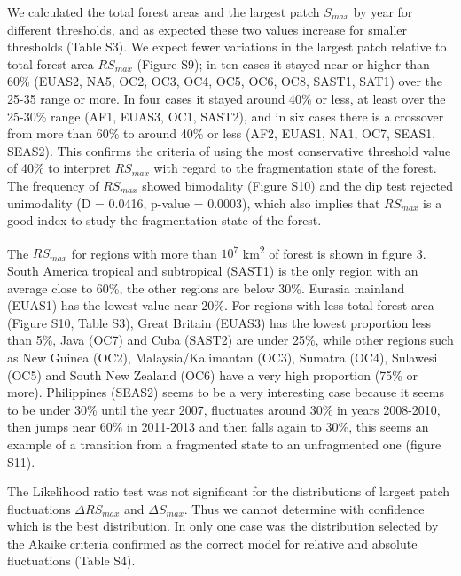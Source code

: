 \documentclass[]{article}
\begin{document}
We calculated the total forest areas and the largest patch \(S_{max}\)
by year for different thresholds, and as expected these two values
increase for smaller thresholds (Table S3). We expect fewer variations
in the largest patch relative to total forest area \(RS_{max}\) (Figure
S9); in ten cases it stayed near or higher than 60\% (EUAS2, NA5, OC2,
OC3, OC4, OC5, OC6, OC8, SAST1, SAT1) over the 25-35 range or more. In
four cases it stayed around 40\% or less, at least over the 25-30\%
range (AF1, EUAS3, OC1, SAST2), and in six cases there is a crossover
from more than 60\% to around 40\% or less (AF2, EUAS1, NA1, OC7, SEAS1,
SEAS2). This confirms the criteria of using the most conservative
threshold value of 40\% to interpret \(RS_{max}\) with regard to the
fragmentation state of the forest. The frequency of \(RS_{max}\) showed
bimodality (Figure S10) and the dip test rejected unimodality (D =
0.0416, p-value = 0.0003), which also implies that \(RS_{max}\) is a
good index to study the fragmentation state of the forest.

The \(RS_{max}\) for regions with more than \(10^{7}\) \si{km^2} of
forest is shown in figure 3. South America tropical and subtropical
(SAST1) is the only region with an average close to 60\%, the other
regions are below 30\%. Eurasia mainland (EUAS1) has the lowest value
near 20\%. For regions with less total forest area (Figure S10, Table
S3), Great Britain (EUAS3) has the lowest proportion less than 5\%, Java
(OC7) and Cuba (SAST2) are under 25\%, while other regions such as New
Guinea (OC2), Malaysia/Kalimantan (OC3), Sumatra (OC4), Sulawesi (OC5)
and South New Zealand (OC6) have a very high proportion (75\% or more).
Philippines (SEAS2) seems to be a very interesting case because it seems
to be under 30\% until the year 2007, fluctuates around 30\% in years
2008-2010, then jumps near 60\% in 2011-2013 and then falls again to
30\%, this seems an example of a transition from a fragmented state to
an unfragmented one (figure S11).

The Likelihood ratio test was not significant for the distributions of
largest patch fluctuations \(\Delta RS_{max}\) and \(\Delta S_{max}\).
Thus we cannot determine with confidence which is the best distribution.
In only one case was the distribution selected by the Akaike criteria
confirmed as the correct model for relative and absolute fluctuations
(Table S4).
\end{document}
